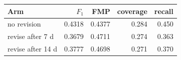 \begin{tabular}{lrrrr}
\toprule
Arm & $F_1$ & FMP & coverage & recall \\
\midrule
no revision & 0.4318 & 0.4377 & 0.284 & 0.450 \\
revise after 7 d & 0.3679 & 0.4711 & 0.274 & 0.363 \\
revise after 14 d & 0.3777 & 0.4698 & 0.271 & 0.370 \\
\bottomrule
\end{tabular}
